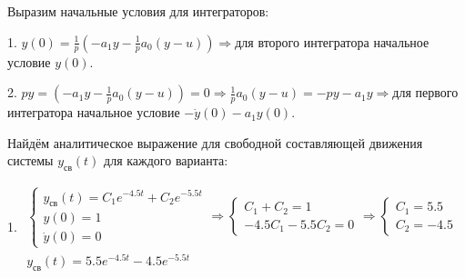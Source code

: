 \begin{par}
\begin{flushleft}
Выразим начальные условия для интеграторов:
\end{flushleft}
\end{par}

\begin{par}
\begin{flushleft}
1. $y(0)=\frac{1}{p}(-a_1 y-\frac{1}{p}a_0 (y-u))\Rightarrow$для второго интегратора начальное условие $y(0)$.
\end{flushleft}
\end{par}

\begin{par}
\begin{flushleft}
2. $py=(-a_1 y-\frac{1}{p}a_0 (y-u))=0\Rightarrow \frac{1}{p}a_0 (y-u)=-py-a_1 y\Rightarrow$для первого интегратора начальное условие $-\dot{y} (0)-a_1 y(0)$.
\end{flushleft}
\end{par}

\begin{par}
\begin{flushleft}
Найдём аналитическое выражение для свободной составляющей движения системы $y_{\textrm{св}} (t)$ для каждого варианта:
\end{flushleft}
\end{par}

\begin{par}
\begin{flushleft}
1. $\begin{array}{l}
\left\lbrace \begin{array}{c}
y_{св} (t)=C_1 e^{-4.5t} +C_2 e^{-5.5t} \\
y(0)=1\\
\dot{y} (0)=0
\end{array}\right.\Rightarrow \left\lbrace \begin{array}{c}
C_1 +C_2 =1\\
-4.5C_1 -5.5C_2 =0
\end{array}\right.\Rightarrow \left\lbrace \begin{array}{c}
C_1 =5.5\\
C_2 =-4.5
\end{array}\right.\\
y_{св} (t)=5.5e^{-4.5t} -4.5e^{-5.5t} 
\end{array}$
\end{flushleft}
\end{par}


